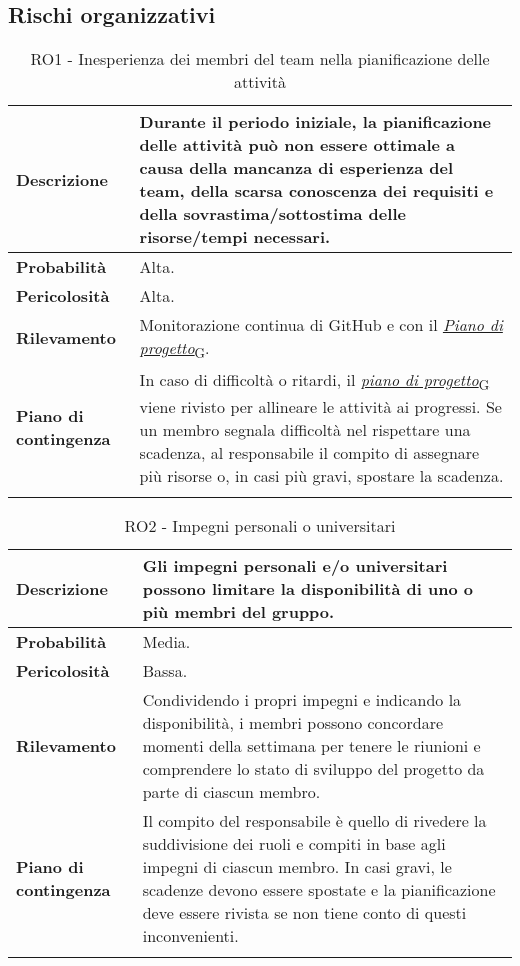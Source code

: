 \clearpage


\subsection{Rischi organizzativi}
\begin{longtable}{ | l | p{10cm} | }
    \hline
    \textbf{Descrizione} & Durante il periodo iniziale, la pianificazione delle attività può non essere ottimale a causa della mancanza di esperienza del team, della scarsa conoscenza dei requisiti e della sovrastima/sottostima delle risorse/tempi necessari. \\
    \hline
    \textbf{Probabilità} & Alta. \\
    \hline
    \textbf{Pericolosità} & Alta. \\
    \hline
    \textbf{Rilevamento} & Monitorazione continua di GitHub e con il \href{https://7last.github.io/docs/rtb/documentazione-interna/glossario#piano-di-progetto}{\textit{Piano di progetto}\textsubscript{G}}. \\
    \hline
    \textbf{Piano di contingenza} & In caso di difficoltà o ritardi, il \href{https://7last.github.io/docs/rtb/documentazione-interna/glossario#piano-di-progetto}{\textit{piano di progetto}\textsubscript{G}} viene rivisto per allineare le attività ai progressi. Se un membro segnala difficoltà nel rispettare una scadenza, al responsabile il compito di assegnare più risorse o, in casi più gravi, spostare la scadenza.\\
    \hline
    \caption{RO1 - Inesperienza dei membri del team nella pianificazione delle attività}
    \label{table:1}
\end{longtable}

\newpage
\begin{longtable}{ | l | p{10cm} | }
    \hline
    \textbf{Descrizione} & Gli impegni personali e/o universitari possono limitare la disponibilità di uno o più membri del gruppo. \\
    \hline
    \textbf{Probabilità} & Media. \\
    \hline
    \textbf{Pericolosità} & Bassa. \\
    \hline
    \textbf{Rilevamento} & Condividendo i propri impegni e indicando la disponibilità, i membri possono concordare momenti della settimana per tenere le riunioni e comprendere lo stato di sviluppo del progetto da parte di ciascun membro. \\
    \hline
    \textbf{Piano di contingenza} & Il compito del responsabile è quello di rivedere la suddivisione dei ruoli e compiti in base agli impegni di ciascun membro. In casi gravi, le scadenze devono essere spostate e la pianificazione deve essere rivista se non tiene conto di questi inconvenienti.\\
    \hline
    \caption{RO2 - Impegni personali o universitari}
    \label{table:2}
\end{longtable}

